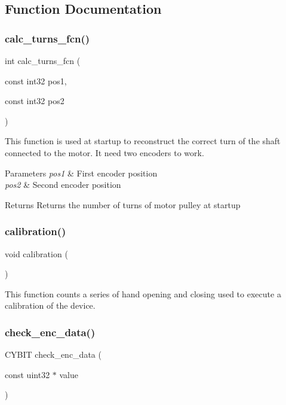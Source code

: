 \subsection{Function Documentation}
\mbox{\label{utils_8c_afa68f255d25478e463690f63d529c29d}} 
\subsubsection{calc\+\_\+turns\+\_\+fcn()}
{\footnotesize\ttfamily int calc\+\_\+turns\+\_\+fcn (\begin{DoxyParamCaption}\item[{const int32}]{pos1,  }\item[{const int32}]{pos2 }\end{DoxyParamCaption})}

This function is used at startup to reconstruct the correct turn of the shaft connected to the motor. It need two encoders to work.


\begin{DoxyParams}{Parameters}
{\em pos1} & First encoder position \\
\hline
{\em pos2} & Second encoder position\\
\hline
\end{DoxyParams}
\begin{DoxyReturn}{Returns}
Returns the number of turns of motor pulley at startup 
\end{DoxyReturn}
\mbox{\label{utils_8c_a0b6a0b24c6bd8af032a6778166201f7e}} 
\subsubsection{calibration()}
{\footnotesize\ttfamily void calibration (\begin{DoxyParamCaption}{ }\end{DoxyParamCaption})}

This function counts a series of hand opening and closing used to execute a calibration of the device. \mbox{\label{utils_8c_ae7faec5b3a1d000c90f70abfc1dfca92}} 
\subsubsection{check\+\_\+enc\+\_\+data()}
{\footnotesize\ttfamily C\+Y\+B\+IT check\+\_\+enc\+\_\+data (\begin{DoxyParamCaption}\item[{const uint32 $\ast$}]{value }\end{DoxyParamCaption})}

